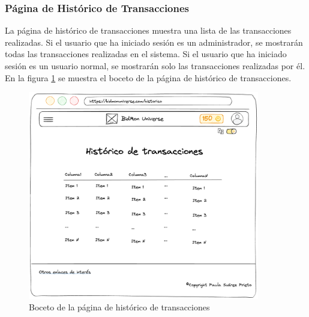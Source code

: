 \subsubsection{Página de Histórico de Transacciones}
La página de histórico de transacciones muestra una lista de las transacciones realizadas.
Si el usuario que ha iniciado sesión es un administrador, se mostrarán todas las transacciones realizadas en el sistema.
Si el usuario que ha iniciado sesión es un usuario normal, se mostrarán solo las transacciones realizadas por él.
En la figura \ref{fig:p_transactions} se muestra el boceto de la página de histórico de transacciones.
\begin{figure}[H]
    \centering
    \includegraphics[width=0.9\textwidth]{figures/6-Analisis/6-Interfaz/prototipos/historico-transacciones.png}
    \caption{Boceto de la página de histórico de transacciones}
    \label{fig:p_transactions}
\end{figure}